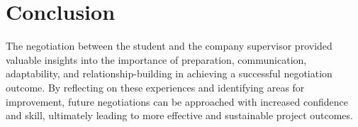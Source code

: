 \section{Conclusion}

The negotiation between the student and the company supervisor provided valuable insights into the importance of preparation, communication, adaptability, and relationship-building in achieving a successful negotiation outcome. By reflecting on these experiences and identifying areas for improvement, future negotiations can be approached with increased confidence and skill, ultimately leading to more effective and sustainable project outcomes.

